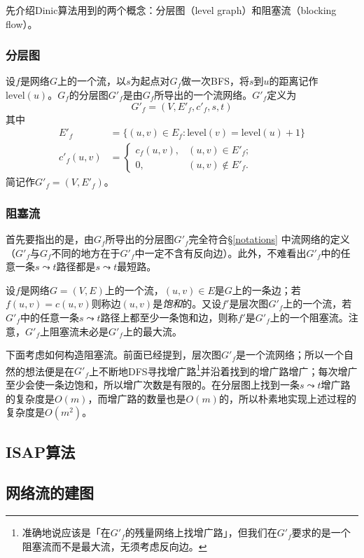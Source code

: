 \documentclass[fontset=ubuntu]{ctexbook}
\begin{document}
    先介绍Dinic算法用到的两个概念：分层图（level graph）和阻塞流（blocking flow）。
    \subsubsection*{分层图}
    设$f$是网络$G$上的一个流，以$s$为起点对$G_f$做一次BFS，将$s$到$u$的距离记作$\mathrm{level}(u)$。$G_f$的分层图$G'_f$是由$G_f$所导出的一个流网络。$G'_f$定义为
    \[
    G'_f =(V, E'_f, c'_f, s, t)
    \]
    其中
    \begin{align*}
        E'_f &= \{(u,v)\in E_f\colon \mathrm{level}(v) = \mathrm{level}(u)+1\} \\
        c'_f(u,v) &=\begin{cases}
        c_f(u,v), & (u,v)\in E'_f;\\
        0, & (u,v)\notin E'_f.\end{cases}
    \end{align*}
    简记作$G'_f =(V, E'_f)$。
    \subsubsection{阻塞流}
    首先要指出的是，由$G_f$所导出的分层图$G'_f$完全符合\S\ref{notations} 中流网络的定义（$G'_f$与$G_f$不同的地方在于$G'_f$中一定不含有反向边）。此外，不难看出$G'_f$中的任意一条$s\leadsto t$路径都是$s\leadsto t$最短路。

    设$f$是网络$G=(V,E)$上的一个流，$(u,v)\in E$是$G$上的一条边；若$f(u,v) = c(u,v)$则称边$(u,v)$是\emph{饱和}的。又设$f'$是层次图$G'_f$上的一个流，若$G'_f$中的任意一条$s\leadsto t$路径上都至少一条饱和边，则称$f'$是$G'_f$上的一个阻塞流。注意，$G'_f$上阻塞流未必是$G'_f$上的最大流。

    下面考虑如何构造阻塞流。前面已经提到，层次图$G'_f$是一个流网络；所以一个自然的想法便是在$G'_f$上不断地DFS寻找增广路\footnote{准确地说应该是「在$G'_f$的残量网络上找增广路」，但我们在$G'_f$要求的是一个阻塞流而不是最大流，无须考虑反向边。}并沿着找到的增广路增广；每次增广至少会使一条边饱和，所以增广次数是有限的。在分层图上找到一条$s\leadsto t$增广路的复杂度是$O(m)$，而增广路的数量也是$O(m)$的，所以朴素地实现上述过程的复杂度是$O(m^2)$。

    \subsection{ISAP算法}
    \subsection{网络流的建图}
\end{document}
